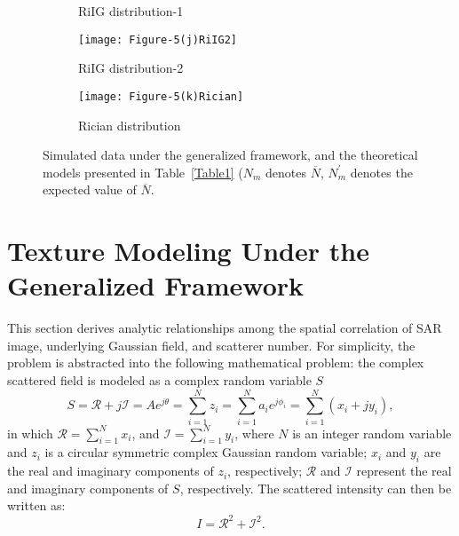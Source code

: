\documentclass[journal]{IEEEtran}
\begin{document}
\begin{figure*}[htb]
\begin{subfigure}[t]{4.2cm}
	\caption{RiIG distribution-1}\label{Figure5(i)}
\end{subfigure}
\begin{subfigure}[t]{4.2cm}
	\centering
	\texttt{[image: Figure-5(j)RiIG2]}
	\caption{RiIG distribution-2}\label{Figure5(j)}
\end{subfigure}
\begin{subfigure}[t]{4.2cm}
	\centering
	\texttt{[image: Figure-5(k)Rician]}
	\caption{Rician distribution}\label{Figure5(k)}
\end{subfigure}
\caption{Simulated data under the generalized framework, and the theoretical models presented in Table~\ref{Table1} ($N_{m}$ denotes $\overline{N}$, $N_{m}^{\prime}$ denotes the expected value of $\overline{N}$.}\label{Figure5}
\end{figure*}

\section{Texture Modeling Under the Generalized Framework}\label{Sec:Texture}

This section derives analytic relationships among the spatial correlation of SAR image, underlying Gaussian field, and scatterer number.
For simplicity, the problem is abstracted into the following mathematical problem:
the complex scattered field is modeled as a complex random variable $S$
\begin{equation}
S  = \mathcal{R}+j \mathcal{I}=A e^{j \theta}=\sum_{i=1}^{N} z_{i}
=\sum_{i=1}^{N} a_{i} e^{j \phi_{i}}=\sum_{i=1}^{N}\left(x_{i}+j y_{i}\right),
\label{eq14}
\end{equation}
in which $\mathcal{R}=\sum_{i=1}^{N} x_{i}$, and $\mathcal{I}=\sum_{i=1}^{N} y_{i}$,
where $N$ is an integer random variable and $z_i$ is a circular symmetric complex Gaussian random variable;
$x_i$ and $y_i$ are the real and imaginary components of $z_i$, respectively;
$\mathcal{R}$ and $\mathcal{I}$ represent the real and imaginary components of $S$, respectively.
The scattered intensity can then be written as:
\begin{equation}
I=\mathcal{R}^{2}+\mathcal{I}^{2}.
\label{eq15}
\end{equation}
\end{document}
